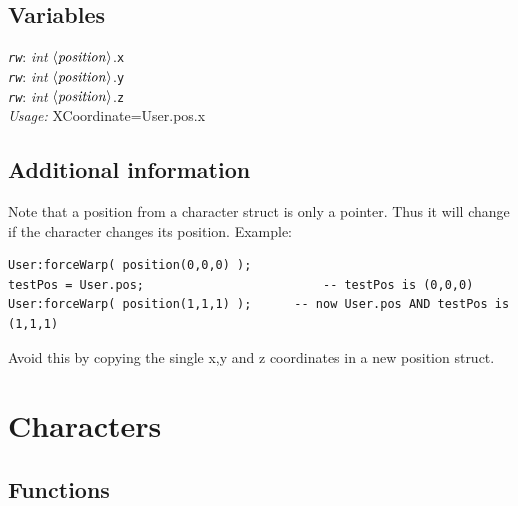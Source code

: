 \documentclass[a4paper,10pt,makeidx]{scrreprt}
\newcommand{\comm}[1]{\index{#1}\texttt{#1}}
\newcommand{\var}[1]{$\left\langle \text{\emph{#1}} \right\rangle$}
\newcommand{\lua}[1]{\index{#1}\texttt{\emph{#1}}}
\newcommand{\integer}{\textsl{int }}
\begin{document}
\section{Variables}
\lua{rw}: \integer \var{position}.\comm{x}\\
\lua{rw}: \integer \var{position}.\comm{y}\\
\lua{rw}: \integer \var{position}.\comm{z}\\
\emph{Usage:} XCoordinate=User.pos.x

\section{Additional information}
Note that a position from a character struct is only a pointer. Thus it will change if the character changes its position. Example: \\
\begin{verbatim}
User:forceWarp( position(0,0,0) );
testPos = User.pos;							-- testPos is (0,0,0)
User:forceWarp( position(1,1,1) );		-- now User.pos AND testPos is (1,1,1)
\end{verbatim}

Avoid this by copying the single x,y and z coordinates in a new position struct.


\chapter{Characters}

\section{Functions}
\end{document}
